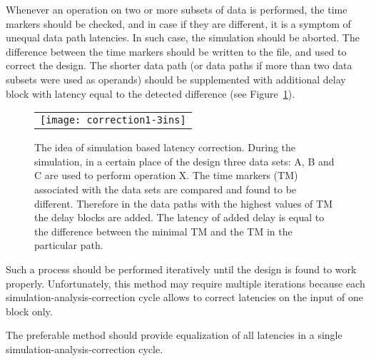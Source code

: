 \documentclass[preprint,11pt]{elsarticle}
\begin{document}
Whenever an operation on two or more subsets of data is performed, the time markers should
be checked, and in case if they are different, it is a symptom of unequal data path
latencies. In such case, the simulation should be aborted. The difference between the
time markers should be written to the file, and used to correct the design.
The shorter data path (or data paths if more than two data subsets were used as operands)
should be supplemented with additional delay block with latency equal to the detected difference (see Figure~\ref{fig:correction1-3inputs}).
 \begin{figure}[t]
  {   
   \begin{center}
    \begin{tabular}{c}
    \texttt{[image: correction1-3ins]}
    \end{tabular}
    \end{center}
    \caption
    { \label{fig:correction1-3inputs}
     The idea of simulation based latency correction. During the simulation, in a certain place of the 
	 design three data sets: A, B and C are used to perform operation X. The time markers (TM) associated
	 with the data sets are compared and found to be different. Therefore in the data paths with
	 the highest values of TM the delay blocks are added. The latency of added delay is equal to the
	 difference between the minimal TM and the TM in the particular path.
	}
  }
 \end{figure}
Such a process should be performed iteratively until the design is found to work properly. Unfortunately, this method may require multiple iterations because 
each simulation-analysis-correction cycle allows to correct latencies on the input of one block only.

The preferable method should provide equalization of all latencies in a single
simulation-analysis-correction cycle.
\end{document}
